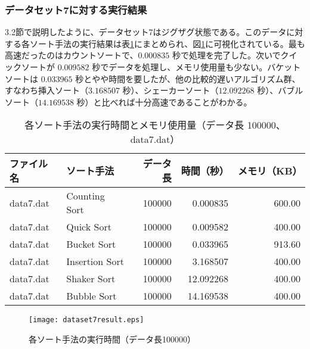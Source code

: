 \documentclass[a4j, 12pt]{jarticle}
\begin{document}
\subsubsection{データセット7に対する実行結果}
3.2節で説明したように、データセット7はジグザグ状態である。このデータに対する各ソート手法の実行結果は表\ref{dataset7allresult}にまとめられ、図\ref{dataset7allresultgraph}に可視化されている。最も高速だったのはカウントソートで、$0.000835$ 秒で処理を完了した。次いでクイックソートが $0.009582$ 秒でデータを処理し、メモリ使用量も少ない。バケットソートは $0.033965$ 秒とやや時間を要したが、他の比較的遅いアルゴリズム群、すなわち挿入ソート（$3.168507$ 秒）、シェーカーソート（$12.092268$ 秒）、バブルソート（$14.169538$ 秒）と比べれば十分高速であることがわかる。
\begin{table}[H]
  \centering
  \caption{各ソート手法の実行時間とメモリ使用量（データ長 100000、data7.dat）}\label{dataset7allresult}
  \begin{tabular}{|l|l|r|r|r|}
    \hline
    \textbf{ファイル名} & \textbf{ソート手法} & \textbf{データ長} & \textbf{時間（秒）} & \textbf{メモリ（KB）} \\
    \hline
    data7.dat & Counting Sort  & 100000 & 0.000835  & 600.00 \\
    data7.dat & Quick Sort     & 100000 & 0.009582  & 400.00 \\
    data7.dat & Bucket Sort    & 100000 & 0.033965  & 913.60 \\
    data7.dat & Insertion Sort & 100000 & 3.168507  & 400.00 \\
    data7.dat & Shaker Sort    & 100000 & 12.092268 & 400.00 \\
    data7.dat & Bubble Sort    & 100000 & 14.169538 & 400.00 \\
    \hline
  \end{tabular}
\end{table}
\begin{figure}[H]
  \centering
  \texttt{[image: dataset7result.eps]}
  \caption{各ソート手法の実行時間（データ長100000）}\label{dataset7allresultgraph}
\end{figure}
\end{document}
